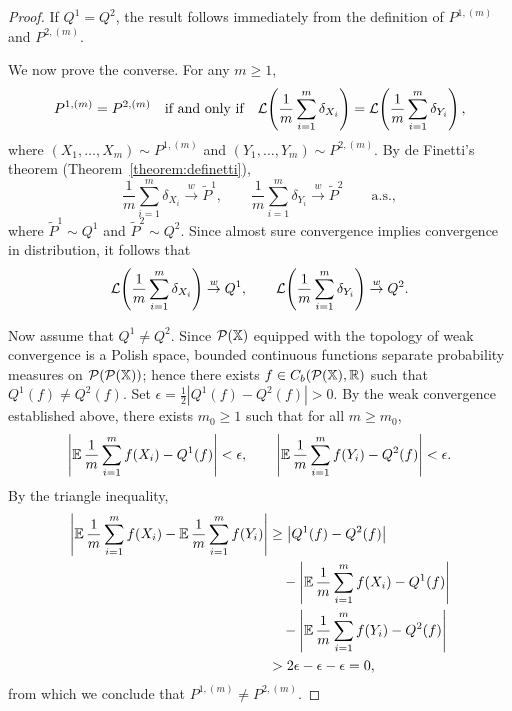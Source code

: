 \begin{proof}
If $Q^1 = Q^2$, the result follows immediately from the definition of $P^{1,(m)}$ and $P^{2,(m)}$.

We now prove the converse. For any $m \geq 1$,
\[
P^{1,(m)} = P^{2,(m)} \quad \text{if and only if} \quad
\mathcal{L}\!\left( \frac{1}{m}\sum_{i=1}^m \delta_{X_i}\right) =
\mathcal{L}\!\left( \frac{1}{m}\sum_{i=1}^m \delta_{Y_i}\right),
\]
where $(X_1,\dots, X_m) \sim P^{1,(m)}$ and $(Y_1,\dots, Y_m) \sim P^{2,(m)}$. By de Finetti's theorem (Theorem~\ref{theorem:definetti}),
\[
\frac{1}{m}\sum_{i=1}^m \delta_{X_i} \overset{w}{\to} \widetilde{P}^1, \qquad
\frac{1}{m}\sum_{i=1}^m \delta_{Y_i} \overset{w}{\to} \widetilde{P}^2 \qquad \text{a.s.},
\]
where $\widetilde{P}^1 \sim Q^1$ and $\widetilde{P}^2 \sim Q^2$. Since almost sure convergence implies convergence in distribution, it follows that
\[
\mathcal{L}\!\left(\frac{1}{m}\sum_{i=1}^m \delta_{X_i}\right) \overset{w}{\to} Q^1, \qquad
\mathcal{L}\!\left(\frac{1}{m}\sum_{i=1}^m \delta_{Y_i}\right) \overset{w}{\to} Q^2.
\]

Now assume that $Q^1 \neq Q^2$. Since $\mathcal{P}(\mathbb{X})$ equipped with the topology of weak convergence is a Polish space, bounded continuous functions separate probability measures on $\mathcal{P}(\mathcal{P}(\mathbb{X}))$; hence there exists $f \in C_b(\mathcal{P}(\mathbb{X}), \mathbb{R})$ such that $Q^1(f) \neq Q^2(f)$. Set $\epsilon = \tfrac{1}{2}\left|Q^1(f) - Q^2(f)\right| > 0$. By the weak convergence established above, there exists $m_0 \geq 1$ such that for all $m \geq m_0$,
\[
\left|\mathbb{E}\,\frac{1}{m}\sum_{i=1}^m f(X_i) - Q^1(f) \right| < \epsilon, \qquad
\left|\mathbb{E}\,\frac{1}{m}\sum_{i=1}^m f(Y_i) - Q^2(f) \right| < \epsilon.
\]
By the triangle inequality,
\begin{align*}
\left|\mathbb{E}\,\frac{1}{m}\sum_{i=1}^m f(X_i) - \mathbb{E}\,\frac{1}{m}\sum_{i=1}^m f(Y_i) \right|
&\geq \left|Q^1(f) - Q^2(f)\right| \\
&\quad - \left|\mathbb{E}\,\frac{1}{m}\sum_{i=1}^m f(X_i) - Q^1(f)\right| \\
&\quad - \left|\mathbb{E}\,\frac{1}{m}\sum_{i=1}^m f(Y_i) - Q^2(f)\right| \\
&> 2\epsilon - \epsilon - \epsilon = 0,
\end{align*}
from which we conclude that $P^{1,(m)} \neq P^{2,(m)}$.
\end{proof}


